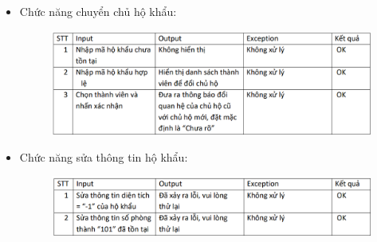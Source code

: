 \documentclass{article}
\begin{document}
\begin{itemize}
\begin{figure}[H]
    \end{figure}
    \newpage
    \item Chức năng chuyển chủ hộ khẩu:
    \begin{figure}[H]
        \centering
        \includegraphics[width=1\textwidth]{Kiểm thử/KT sửa chủ hộ.png}
    \end{figure}
    \item Chức năng sửa thông tin hộ khẩu:
    \begin{figure}[H]
        \centering
        \includegraphics[width=1\textwidth]{Kiểm thử/Kt sửa thông tin hộ.png}
    \end{figure}
\end{itemize}
\end{document}
